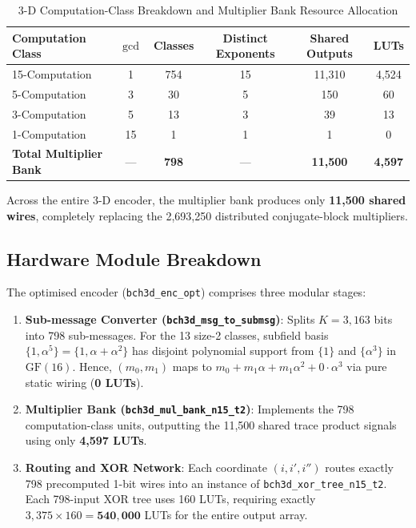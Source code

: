 \documentclass[11pt,a4paper]{article}
\begin{document}
\begin{table}[htbp]
\centering
\caption{3-D Computation-Class Breakdown and Multiplier Bank Resource Allocation}
\label{tab:comp_classes}
\vspace{0.2cm}
\begin{tabular}{lccccc}
\toprule
\textbf{Computation Class} & $\gcd$ & \textbf{Classes} & \textbf{Distinct Exponents} & \textbf{Shared Outputs} & \textbf{LUTs} \\
\midrule
15-Computation & 1 & 754 & 15 & 11,310 & 4,524 \\
5-Computation  & 3 &  30 &  5 &    150 &    60 \\
3-Computation  & 5 &  13 &  3 &     39 &    13 \\
1-Computation  & 15 &  1 &  1 &      1 &     0 \\
\midrule
\textbf{Total Multiplier Bank} & --- & \textbf{798} & --- & \textbf{11,500} & \textbf{4,597} \\
\bottomrule
\end{tabular}
\end{table}

\noindent Across the entire 3-D encoder, the multiplier bank produces only \textbf{11,500 shared wires}, completely replacing the 2,693,250 distributed conjugate-block multipliers.

\subsection{Hardware Module Breakdown}
The optimised encoder (\texttt{bch3d\_enc\_opt}) comprises three modular stages:
\begin{enumerate}
    \item \textbf{Sub-message Converter (\texttt{bch3d\_msg\_to\_submsg})}: Splits $K=3,163$ bits into 798 sub-messages. For the 13 size-2 classes, subfield basis $\{1, \alpha^5\} = \{1, \alpha + \alpha^2\}$ has disjoint polynomial support from $\{1\}$ and $\{\alpha^3\}$ in $\text{GF}(16)$. Hence, $(m_0, m_1)$ maps to $m_0 + m_1 \alpha + m_1 \alpha^2 + 0 \cdot \alpha^3$ via pure static wiring (\textbf{0 LUTs}).
    \item \textbf{Multiplier Bank (\texttt{bch3d\_mul\_bank\_n15\_t2})}: Implements the 798 computation-class units, outputting the 11,500 shared trace product signals using only \textbf{4,597 LUTs}.
    \item \textbf{Routing and XOR Network}: Each coordinate $(i, i', i'')$ routes exactly 798 precomputed 1-bit wires into an instance of \texttt{bch3d\_xor\_tree\_n15\_t2}. Each 798-input XOR tree uses 160 LUTs, requiring exactly $3,375 \times 160 = \mathbf{540,000}$ LUTs for the entire output array.
\end{enumerate}
\end{document}
